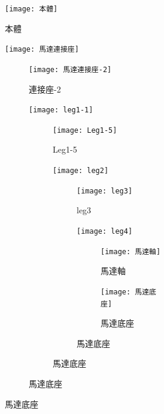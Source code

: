 \begin{figure}[htb!]
  \begin{minipage}[t]{0.4\linewidth}
    \centering
    \texttt{[image: 本體]}
    \caption{本體}
    \label{本體}
  \end{minipage}
  \hfill
  \begin{minipage}[t]{0.4\linewidth}
    \centering
    \texttt{[image: 馬達連接座]}
    \caption{馬達連接座}
    \label{馬達連接座}
  \end{minipage}

\begin{figure}[htb!]
  \begin{minipage}[t]{0.4\linewidth}
    \centering
    \texttt{[image: 馬達連接座-2]}
    \caption{連接座-2}
    \label{馬達連接座-2}
  \end{minipage}
  \hfill
  \begin{minipage}[t]{0.4\linewidth}
    \centering
    \texttt{[image: leg1-1]}
    \caption{leg1-1}
    \label{leg1-1}
  \end{minipage}
  
  \begin{figure}[htb!]
  \begin{minipage}[t]{0.4\linewidth}
    \centering
    \texttt{[image: Leg1-5]}
    \caption{Leg1-5}
    \label{Leg1-5}
  \end{minipage}
  \hfill
  \begin{minipage}[t]{0.4\linewidth}
    \centering
    \texttt{[image: leg2]}
    \caption{leg2}
    \label{leg2}
  \end{minipage}
  
  \begin{figure}[htb!]
  \begin{minipage}[t]{0.4\linewidth}
    \centering
    \texttt{[image: leg3]}
    \caption{leg3}
    \label{leg3}
  \end{minipage}
  \hfill
  \begin{minipage}[t]{0.4\linewidth}
    \centering
    \texttt{[image: leg4]}
    \caption{leg4}
    \label{leg4}
  \end{minipage}
  
  \begin{figure}[htb!]
  \begin{minipage}[t]{0.4\linewidth}
    \centering
    \texttt{[image: 馬達軸]}
    \caption{馬達軸}
    \label{馬達軸}
  \end{minipage}
  \hfill
  \begin{minipage}[t]{0.4\linewidth}
    \centering
    \texttt{[image: 馬達底座]}
    \caption{馬達底座}
    \label{馬達底座}
  \end{minipage}
\newpage


\end{figure}
\end{figure}
\end{figure}
\end{figure}
\end{figure}
